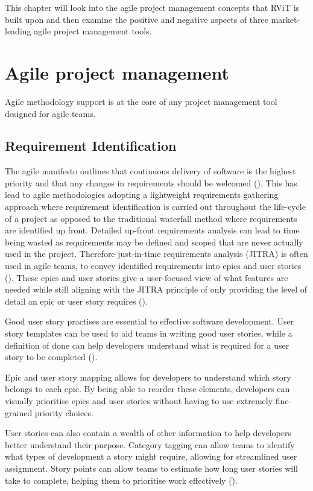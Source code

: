 \documentclass[l4proj.tex]{subfiles}
\begin{document}
    

This chapter will look into the agile project management concepts that RViT is built upon and then examine the positive and negative aspects of three market-leading agile project management tools.

\section{Agile project management}
Agile methodology support is at the core of any project management tool designed for agile teams.

\subsection{Requirement Identification}
The agile manifesto outlines that continuous delivery of software is the highest priority and that any changes in requirements should be welcomed (\cite{Kent2001(manifesto)}). This has lead to agile methodologies adopting a lightweight requirements gathering approach where requirement identification is carried out throughout the life-cycle of a project as opposed to the traditional waterfall method where requirements are identified up front. Detailed up-front requirements analysis can lead to time being wasted as requirements may be defined and scoped that are never actually used in the project. Therefore just-in-time requirements analysis (JITRA) is often used in agile teams, to convey identified requirements into epics and user stories (\cite{Schon2017}). These epics and user stories give a user-focused view of what features are needed while still aligning with the JITRA principle of only providing the level of detail an epic or user story requires (\cite{BHOWMIK2019}).

Good user story practises are essential to effective software development. User story templates can be used to aid teams in writing good user stories, while a definition of done can help developers understand what is required for a user story to be completed (\cite{Silva2017}).

Epic and user story mapping allows for developers to understand which story belongs to each epic. By being able to reorder these elements, developers can visually prioritise epics and user stories without having to use extremely fine-grained priority choices.

User stories can also contain a wealth of other information to help developers better understand their purpose. Category tagging can allow teams to identify what types of development a story might require, allowing for streamlined user assignment. Story points can allow teams to estimate how long user stories will take to complete, helping them to prioritise work effectively (\cite{Coelho2012}). 
\end{document}
